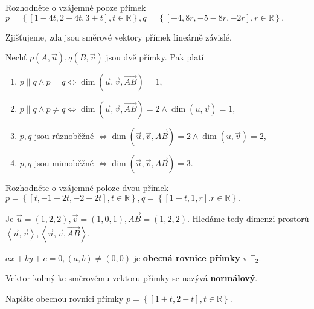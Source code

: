 \begin{priklad}
Rozhodněte o vzájemné pooze přímek $p=\left \{ [1-4t,2+4t,3+t], t \in \mathbb R \right \},q=\left \{ [-4,8r,-5-8r,-2r],r \in \mathbb R \right \} . $
\end{priklad}

\begin{reseni}
Zjišťujeme, zda jsou směrové vektory přímek lineárně závislé.
\end{reseni}

\begin{veta}
    Nechť $p(A,\vec u), q(B, \vec v)$ jsou dvě přímky. Pak platí
    \begin{enumerate}[$i.$]
    \item $p\parallel q \land p=q \iff \dim(\vec u, \vec v, \overrightarrow{AB})=1,$
   	\item $p\parallel q \land p\ne q \iff \dim(\vec u, \vec v, \overrightarrow{AB})=2 \land \dim ( u, \vec v) = 1$,
    \item $p, q$ jsou různoběžné $ \iff \dim(\vec u, \vec v, \overrightarrow{AB})=2 \land \dim ( u, \vec v) = 2$,
    \item $p, q$ jsou mimoběžné $\iff \dim(\vec u, \vec v, \overrightarrow{AB})=3.$
    \end{enumerate}
\end{veta}

\begin{priklad}
Rozhodněte o vzájemné poloze dvou přímek $p=\left \{ [t,-1+2t,-2+2t], t \in \mathbb R \right \}, q=\left \{ [1+t,1,r]. r \in \mathbb R \right \}.  $
\end{priklad}

\begin{reseni}
Je $\vec u = (1,2,2), \vec v = (1,0,1), \overrightarrow{AB}=(1,2,2).$ Hledáme tedy
dimenzi prostorů $\left < \vec u, \vec v \right >, \left < \vec u, \vec v, \overrightarrow{AB} \right >.  $
\end{reseni}

\begin{definition}
    $ax+by+c=0, (a,b)\ne(0,0)$ je \textbf{obecná rovnice přímky} v $\mathbb E_2$.
\end{definition}

\begin{definition}
    Vektor kolmý ke směrovému vektoru přímky se nazývá \textbf{normálový}.
\end{definition}

\begin{priklad}
Napište obecnou rovnici přímky $p=\left \{ [1+t,2-t], t \in \mathbb R \right \} .$
\end{priklad}

